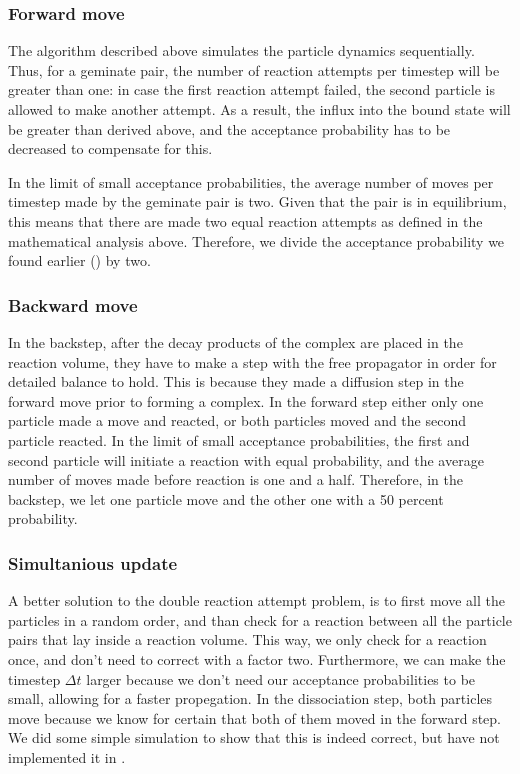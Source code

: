 \subsubsection{Forward move}
The algorithm described above simulates the particle dynamics sequentially. Thus, for a geminate pair, the number of reaction attempts per timestep will be greater than one: in case the first reaction attempt failed, the second particle is allowed to make another attempt. As a result, the influx into the bound state will be greater than derived above, and the acceptance probability has to be decreased to compensate for this. 

In the limit of small acceptance probabilities, the average number of moves per timestep made by the geminate pair is two. Given that the pair is in equilibrium, this means that there are made two equal reaction attempts as defined in the mathematical analysis above. Therefore, we divide the acceptance probability we found earlier () by two.

\subsubsection{Backward move}
In the backstep, after the decay products of the complex are placed in the reaction volume, they have to make a step with the free propagator in order for detailed balance to hold. This is because they made a diffusion step in the forward move prior to forming a complex. In the forward step either only one particle made a move and reacted, or both particles moved and the second particle reacted. In the limit of small acceptance probabilities, the first and second particle will initiate a reaction with equal probability, and the average number of moves made before reaction is one and a half. Therefore, in the backstep, we let one particle move and the other one with a 50 percent probability.

\subsubsection{Simultanious update}
A better solution to the double reaction attempt problem, is to first move all the particles in a random order, and than check for a reaction between all the particle pairs that lay inside a reaction volume. This way, we only check for a reaction once, and don't need to correct with a factor two. Furthermore, we can make the timestep $\Delta t$ larger because we don't need our acceptance probabilities to be small, allowing for a faster propegation. In the dissociation step, both particles move because we know for certain that both of them moved in the forward step. We did some simple simulation to show that this is indeed correct, but have not implemented it in \GFRD.


